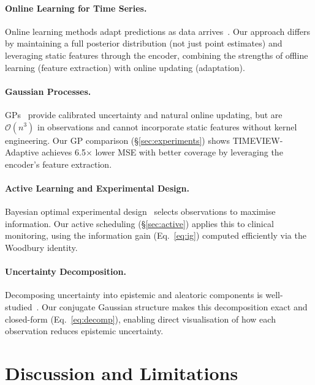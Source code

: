 \documentclass[final]{article}
\begin{document}
\paragraph{Online Learning for Time Series.} Online learning methods adapt predictions as data arrives~\citep{anava2013online, liu2016online}. Our approach differs by maintaining a full posterior distribution (not just point estimates) and leveraging static features through the encoder, combining the strengths of offline learning (feature extraction) with online updating (adaptation).

\paragraph{Gaussian Processes.} GPs~\citep{williams2006gaussian} provide calibrated uncertainty and natural online updating, but are $\mathcal{O}(n^3)$ in observations and cannot incorporate static features without kernel engineering. Our GP comparison (\S\ref{sec:experiments}) shows TIMEVIEW-Adaptive achieves 6.5$\times$ lower MSE with better coverage by leveraging the encoder's feature extraction.

\paragraph{Active Learning and Experimental Design.} Bayesian optimal experimental design~\citep{chaloner1995bayesian, foster2021deep} selects observations to maximise information. Our active scheduling (\S\ref{sec:active}) applies this to clinical monitoring, using the information gain (Eq.~\ref{eq:ig}) computed efficiently via the Woodbury identity.

\paragraph{Uncertainty Decomposition.} Decomposing uncertainty into epistemic and aleatoric components is well-studied~\citep{der2009aleatory, kendall2017uncertainties}. Our conjugate Gaussian structure makes this decomposition exact and closed-form (Eq.~\ref{eq:decomp}), enabling direct visualisation of how each observation reduces epistemic uncertainty.

\section{Discussion and Limitations}
\label{sec:discussion}
\end{document}
